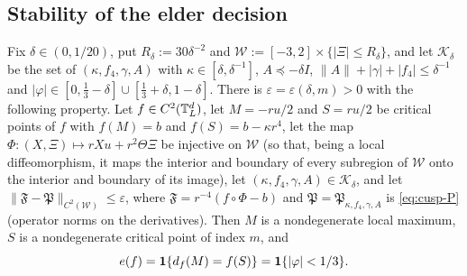 \subsection{Stability of the elder decision}\label{ssec:cusp-stable}

\begin{proposition}[stability]\label{prop:cusp-stable}
Fix $\delta\in(0,1/20)$, put $R_\delta:=30\delta^{-2}$ and $\mathcal W:=[-3,2]\times\{|\Xi|\le R_\delta\}$, and let $\mathcal K_\delta$ be the set of $(\kappa,f_4,\gamma,A)$ with $\kappa\in[\delta,\delta^{-1}]$, $A\preceq-\delta I$, $\|A\|+|\gamma|+|f_4|\le\delta^{-1}$ and $|\varphi|\in[0,\frac13-\delta]\cup[\frac13+\delta,1-\delta]$. There is $\varepsilon=\varepsilon(\delta,m)>0$ with the following property. Let $f\in C^2(\mathbb T^d_L)$, let $M=-ru/2$ and $S=ru/2$ be critical points of $f$ with $f(M)=b$ and $f(S)=b-\kappa r^4$, let the map $\Phi:(X,\Xi)\mapsto rXu+r^2\Theta\Xi$ be injective on $\mathcal W$ (so that, being a local diffeomorphism, it maps the interior and boundary of every subregion of $\mathcal W$ onto the interior and boundary of its image), let $(\kappa,f_4,\gamma,A)\in\mathcal K_\delta$, and let $\|\mathfrak F-\mathfrak P\|_{C^2(\mathcal W)}\le\varepsilon$, where $\mathfrak F=r^{-4}(f\circ\Phi-b)$ and $\mathfrak P=\mathfrak P_{\kappa,f_4,\gamma,A}$ is \eqref{eq:cusp-P} (operator norms on the derivatives). Then $M$ is a nondegenerate local maximum, $S$ is a nondegenerate critical point of index $m$, and
\begin{equation}\label{eq:cusp-decision}
e(f)=\mathbf 1\{d_f(M)=f(S)\}=\mathbf 1\{|\varphi|<1/3\}.
\end{equation}
\end{proposition}

